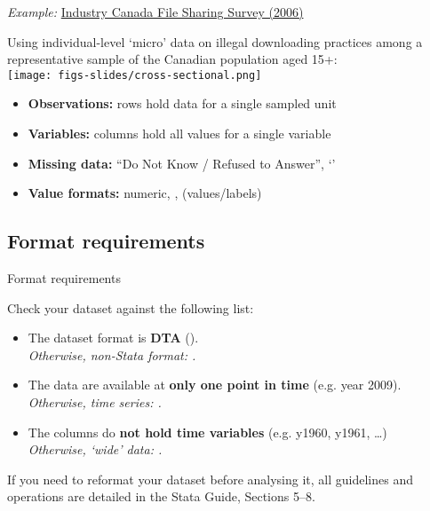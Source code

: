 \documentclass{beamer}
\begin{document}
	\begin{frame}[t]{\textit{Example:} \href{http://www.ic.gc.ca/eic/site/ic1.nsf/eng/01464.html}{Industry Canada File Sharing Survey (2006)}}

	Using individual-level `micro' data on illegal downloading practices among a representative sample of the Canadian population aged 15+:\\[1em]
	
	\texttt{[image: figs-slides/cross-sectional.png]}

	\begin{itemize}
		\item \textbf{Observations:} rows hold data for a single sampled unit
		\item \textbf{Variables:} columns hold all values for a single variable
		\item \textbf{Missing data:} ``Do Not Know / Refused to Answer'', `'
		\item \textbf{Value formats:} numeric, ,  (values/labels)
	\end{itemize}
	
	\end{frame}

	\subsection{Format requirements}
	
	\begin{frame}[t]{Format requirements}
	
	Check your dataset against the following list:

		\begin{itemize}
			\item The dataset format is \textbf{DTA} ().\\
			\textit{Otherwise, non-Stata format: .}
			
			\item The data are available at \textbf{only one point in time} (e.g. year 2009).\\
			\textit{Otherwise, time series: .}
		
			\item The columns do \textbf{not hold time variables} (e.g. y1960, y1961, …)\\
			\textit{Otherwise, `wide' data: .}
		\end{itemize}
			
	If you need to reformat your dataset before analysing it, all guidelines and operations are detailed in the Stata Guide, Sections 5--8.
	
	\end{frame}
\end{document}
